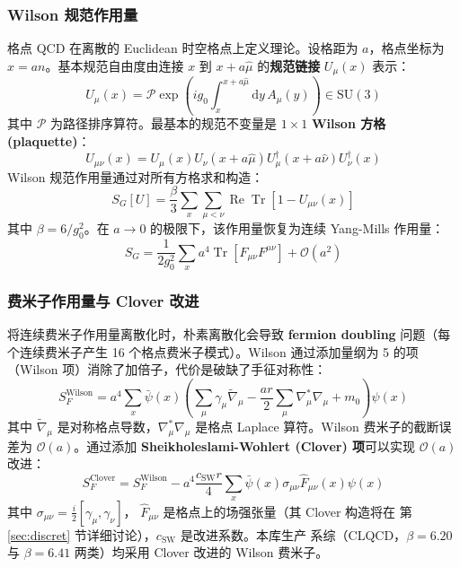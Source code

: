 \documentclass[11pt,a4paper]{ctexart}
\newcommand{\order}[1]{\mathcal{O}(#1)}
\begin{document}
\subsubsection{Wilson 规范作用量}

格点 QCD 在离散的 Euclidean 时空格点上定义理论。设格距为 $a$，格点坐标为
$x = an$。基本规范自由度由连接 $x$ 到 $x+a\hat{\mu}$ 的\textbf{规范链接}
$U_\mu(x)$ 表示：
\begin{equation}
U_\mu(x) = \mathcal{P} \exp\!\left( i g_0 \int_{x}^{x+a\hat{\mu}}
\mathrm{d}y \, A_\mu(y) \right) \in \text{SU}(3)
\end{equation}
其中 $\mathcal{P}$ 为路径排序算符。最基本的规范不变量是 $1\times 1$
\textbf{Wilson 方格 (plaquette)}：
\begin{equation}
U_{\mu\nu}(x) = U_\mu(x) U_\nu(x+a\hat{\mu})
U_\mu^\dagger(x+a\hat{\nu}) U_\nu^\dagger(x)
\end{equation}
Wilson 规范作用量通过对所有方格求和构造：
\begin{equation}
S_G[U] = \frac{\beta}{3} \sum_x \sum_{\mu<\nu} \operatorname{Re}
\operatorname{Tr}[1 - U_{\mu\nu}(x)]
\end{equation}
其中 $\beta = 6/g_0^2$。在 $a \to 0$ 的极限下，该作用量恢复为连续
Yang-Mills 作用量：
\begin{equation}
S_G = \frac{1}{2g_0^2} \sum_x a^4 \operatorname{Tr}[F_{\mu\nu} F^{\mu\nu}]
+ \order{a^2}
\end{equation}

\subsubsection{费米子作用量与 Clover 改进}

将连续费米子作用量离散化时，朴素离散化会导致 \textbf{fermion doubling}
问题（每个连续费米子产生 16 个格点费米子模式）。Wilson 通过添加量纲为 5
的项（Wilson 项）消除了加倍子，代价是破缺了手征对称性：
\begin{equation}
S_F^{\text{Wilson}} = a^4 \sum_x \bar{\psi}(x) \left(
\sum_\mu \gamma_\mu \tilde{\nabla}_\mu - \frac{a r}{2} \sum_\mu
\nabla_\mu^* \nabla_\mu + m_0 \right) \psi(x)
\end{equation}
其中 $\tilde{\nabla}_\mu$ 是对称格点导数，$\nabla_\mu^*\nabla_\mu$ 是格点
Laplace 算符。Wilson 费米子的截断误差为 $\order{a}$。通过添加
\textbf{Sheikholeslami-Wohlert (Clover) 项}可以实现 $\order{a}$ 改进：
\begin{equation}
S_F^{\text{Clover}} = S_F^{\text{Wilson}} - a^4 \frac{c_{\text{SW}} r}{4}
\sum_x \bar{\psi}(x) \sigma_{\mu\nu} \hat{F}_{\mu\nu}(x) \psi(x)
\end{equation}
其中 $\sigma_{\mu\nu} = \frac{i}{2}[\gamma_\mu, \gamma_\nu]$，
$\hat{F}_{\mu\nu}$ 是格点上的场强张量（其 Clover 构造将在
第 \ref{sec:discret} 节详细讨论），$c_{\text{SW}}$ 是改进系数。本库生产
系综（CLQCD，$\beta=6.20$ 与 $\beta=6.41$ 两类）均采用 Clover 改进的
Wilson 费米子。
\end{document}
